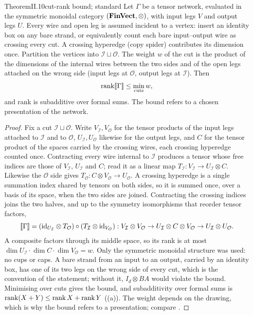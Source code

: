 \begin{restate}{Theorem}{II.10}{cut-rank bound; standard}
Let $\Gamma$ be a tensor network, evaluated in the symmetric monoidal category $(\mathbf{FinVect},\otimes)$, with input legs $V$
and output legs $U$. Every wire and open leg is assumed incident to a vertex: insert an identity box on any bare strand,
or equivalently count each bare input--output wire as crossing every cut. A crossing hyperedge (copy spider) contributes
its dimension once. Partition the vertices into $\mathcal I\sqcup\mathcal O$. The weight $w$ of the cut is the product
of the dimensions of the internal wires between the two sides and of the open legs attached on the wrong side (input legs
at $\mathcal O$, output legs at $\mathcal I$). Then
\begin{equation*}
  \operatorname{rank}\llbracket\Gamma\rrbracket\le\min_{\mathrm{cuts}}w,
\end{equation*}
and rank is subadditive over formal sums. The bound refers to a chosen presentation of the network.
\end{restate}

\begin{proof}
Fix a cut $\mathcal I\sqcup\mathcal O$. Write $V_{\mathcal I},V_{\mathcal O}$ for the tensor products of the input legs
attached to $\mathcal I$ and to $\mathcal O$, $U_{\mathcal I},U_{\mathcal O}$ likewise for the output legs, and $C$ for the
tensor product of the spaces carried by the crossing wires, each crossing hyperedge counted once. Contracting every wire
internal to $\mathcal I$ produces a tensor whose free indices are those of $V_{\mathcal I}$, $U_{\mathcal I}$ and $C$; read
it as a linear map $T_{\mathcal I}:V_{\mathcal I}\to U_{\mathcal I}\otimes C$. Likewise the $\mathcal O$ side gives
$T_{\mathcal O}:C\otimes V_{\mathcal O}\to U_{\mathcal O}$. A crossing hyperedge is a single summation index shared by
tensors on both sides, so it is summed once, over a basis of its space, when the two sides are joined. Contracting the
crossing indices joins the two halves, and up to the symmetry isomorphisms that reorder tensor factors,
\begin{equation*}
  \llbracket\Gamma\rrbracket=(\mathrm{id}_{U_{\mathcal I}}\otimes T_{\mathcal O})\circ(T_{\mathcal I}\otimes\mathrm{id}_{V_{\mathcal O}}):
  V_{\mathcal I}\otimes V_{\mathcal O}\to U_{\mathcal I}\otimes C\otimes V_{\mathcal O}\to U_{\mathcal I}\otimes U_{\mathcal O}.
\end{equation*}
A composite factors through its middle space, so its rank is at most
$\dim U_{\mathcal I}\cdot\dim C\cdot\dim V_{\mathcal O}=w$. Only the symmetric monoidal structure was used: no cups or caps.
A bare strand from an input to an output, carried by an identity box, has one of its two legs on the wrong side of every
cut, which is the convention of the statement; without it, $I_d\otimes BA$ would violate the bound. Minimising over cuts
gives the bound, and subadditivity over formal sums is $\operatorname{rank}(X+Y)\le\operatorname{rank} X+\operatorname{rank} Y$ ((a)). The weight depends on
the drawing, which is why the bound refers to a presentation; compare .
\end{proof}

